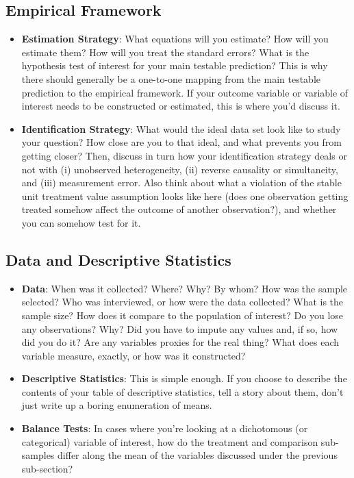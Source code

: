 \subsection{Empirical Framework}
\begin{itemize}
\item \textbf{Estimation Strategy}: What equations will you estimate? How will you estimate them? How will you treat the standard errors? What is the hypothesis test of interest for your main testable prediction? This is why there should generally be a one-to-one mapping from the main testable prediction to the empirical framework. If your outcome variable or variable of interest needs to be constructed or estimated, this is where you'd discuss it.

\item \textbf{Identification Strategy}: What would the ideal data set look like to study your question? How close are you to that ideal, and what prevents you from getting closer? Then, discuss in turn how your identification strategy deals or not with (i) unobserved heterogeneity, (ii) reverse causality or simultaneity, and (iii) measurement error. Also think about what a violation of the stable unit treatment value assumption looks like here (does one observation getting treated somehow affect the outcome of another observation?), and whether you can somehow test for it.
\end{itemize}

\subsection{Data and Descriptive Statistics}
\begin{itemize}
\item \textbf{Data}: When was it collected? Where? Why? By whom? How was the sample selected? Who was interviewed, or how were the data collected? What is the sample size? How does it compare to the population of interest? Do you lose any observations? Why? Did you have to impute any values and, if so, how did you do it? Are any variables proxies for the real thing? What does each variable measure, exactly, or how was it constructed?

\item \textbf{Descriptive Statistics}: This is simple enough. If you choose to describe the contents of your table of descriptive statistics, tell a story about them, don’t just write up a boring enumeration of means.

\item \textbf{Balance Tests}: In cases where you’re looking at a dichotomous (or categorical) variable of interest, how do the treatment and comparison sub-samples differ along the mean of the variables discussed under the previous sub-section?
\end{itemize}

